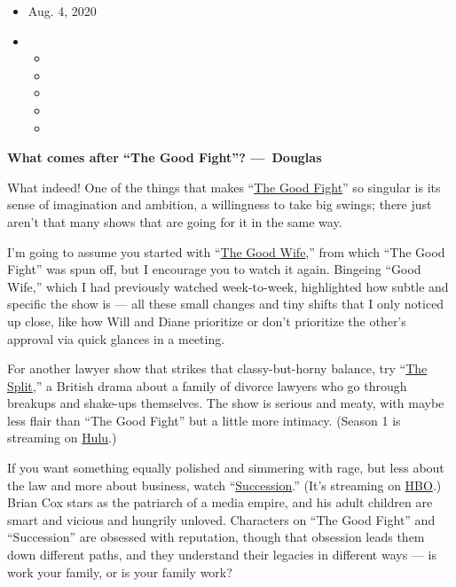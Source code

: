 \begin{itemize}
\item
  Aug. 4, 2020
\item
  \begin{itemize}
  \item
  \item
  \item
  \item
  \item
  \end{itemize}
\end{itemize}

\textbf{What comes after ``The Good Fight''? ---~Douglas}

What indeed! One of the things that makes
``\href{https://www.nytimes3xbfgragh.onion/watching/recommendations/the-good-wifehttps://www.nytimes3xbfgragh.onion/column/the-good-fight-tv-recaps}{The
Good Fight}'' so singular is its sense of imagination and ambition, a
willingness to take big swings; there just aren't that many shows that
are going for it in the same way.

I'm going to assume you started with
``\href{https://www.nytimes3xbfgragh.onion/watching/recommendations/the-good-wife}{The
Good Wife},'' from which ``The Good Fight'' was spun off, but I
encourage you to watch it again. Bingeing ``Good Wife,'' which I had
previously watched week-to-week, highlighted how subtle and specific the
show is --- all these small changes and tiny shifts that I only noticed
up close, like how Will and Diane prioritize or don't prioritize the
other's approval via quick glances in a meeting.

For another lawyer show that strikes that classy-but-horny balance, try
``\href{https://www.nytimes3xbfgragh.onion/watching/titles/the-split}{The
Split},'' a British drama about a family of divorce lawyers who go
through breakups and shake-ups themselves. The show is serious and
meaty, with maybe less flair than ``The Good Fight'' but a little more
intimacy. (Season 1 is streaming on
\href{https://www.hulu.com/series/the-split-5d1de53d-d263-48b9-b44c-75410ef9b9f4}{Hulu}.)

If you want something equally polished and simmering with rage, but less
about the law and more about business, watch
``\href{https://www.nytimes3xbfgragh.onion/spotlight/succession}{Succession}.''
(It's streaming on \href{https://www.hbo.com/succession}{HBO}.) Brian
Cox stars as the patriarch of a media empire, and his adult children are
smart and vicious and hungrily unloved. Characters on ``The Good Fight''
and ``Succession'' are obsessed with reputation, though that obsession
leads them down different paths, and they understand their legacies in
different ways --- is work your family, or is your family work?

